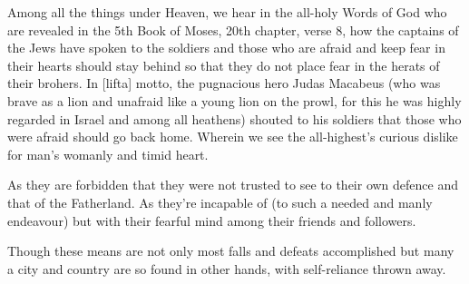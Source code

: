\newpage


\newpage


Among all the things under Heaven, we hear in the all-holy Words of
God who are revealed in the 5th Book of Moses, 20th chapter,
verse 8, how the captains of the Jews have spoken to the soldiers and
those who are afraid and keep fear in their hearts should stay behind
so that they do not place fear in the herats of their brohers. In
[lifta] motto, the pugnacious hero Judas Macabeus (who was brave as a
lion and unafraid like a young lion on the prowl, for this he was
highly regarded in Israel and among all heathens) shouted to his
soldiers that those who were afraid should go back home. Wherein we
see the all-highest's curious dislike for man's womanly and timid
heart.

As they are forbidden that they were not trusted to see to their own
defence and that of the Fatherland. As they're incapable of (to such a
needed and manly endeavour) but with their fearful mind among their
friends and followers. 

Though these means are not only most falls and defeats accomplished
but many a city and country are so found in other hands, with
self-reliance thrown away.